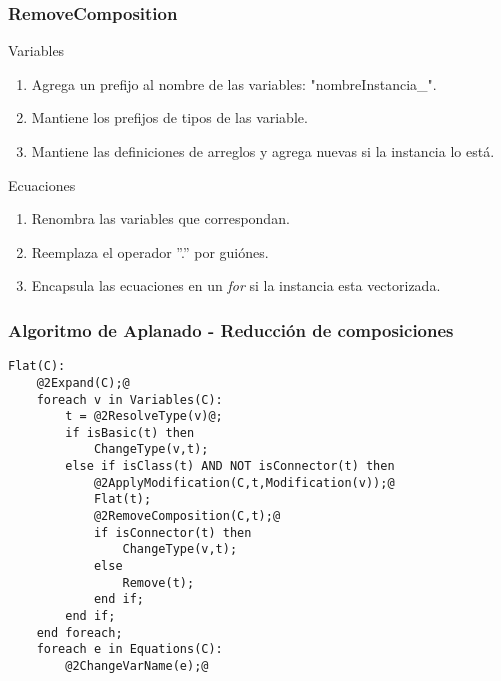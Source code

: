 \begin{frame}[fragile,t]
\frametitle{RemoveComposition} 
\begin{block}{Variables}
\begin{enumerate}
\item Agrega un prefijo al nombre de las variables: "nombreInstancia\_".
\item Mantiene los prefijos de tipos de las  variable. 
\item Mantiene las definiciones de arreglos y agrega nuevas si la instancia lo está.   
\end{enumerate}
\end{block}

\begin{block}{Ecuaciones}
\begin{enumerate}
\item Renombra las variables que correspondan.
\item Reemplaza el operador ''.'' por guiónes.
\item Encapsula las ecuaciones en un \textit{for} si la instancia esta vectorizada.
\end{enumerate}
\end{block}
\end{frame}

\begin{frame}[fragile]
\frametitle{Algoritmo de Aplanado - Reducción de composiciones} 
\begin{lstlisting}[style=base,basicstyle=\scriptsize]
Flat(C):
    @2Expand(C);@
    foreach v in Variables(C):
        t = @2ResolveType(v)@;
        if isBasic(t) then 
            ChangeType(v,t);
        else if isClass(t) AND NOT isConnector(t) then
            @2ApplyModification(C,t,Modification(v));@
            Flat(t);
            @2RemoveComposition(C,t);@  
            if isConnector(t) then
                ChangeType(v,t);
            else
                Remove(t);
            end if;     
        end if;     
    end foreach;    
    foreach e in Equations(C):  
        @2ChangeVarName(e);@     
\end{lstlisting}
\end{frame}

